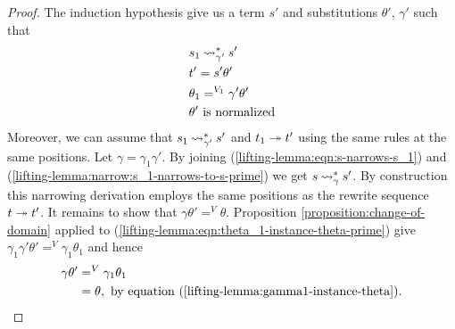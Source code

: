 \begin{lemma}
\begin{proof}
		The induction hypothesis give us a term $s'$ and substitutions $\theta'$, $\gamma'$ such that
		\begin{align}
			 & s_1 \mathbin{\rightsquigarrow}_{\gamma'}^{*} s' \label{lifting-lemma:narrow:s_1-narrows-to-s-prime}       \\
			 & t' = s'\theta'                                                                         \\
			 & \theta_1 =^{V_1} \gamma'\theta' \label{lifting-lemma:eqn:theta_1-instance-theta-prime} \\
			 & \theta' \text{ is normalized} \label{lifting-lemma:eqn:theta-prime-is-normalized}
		\end{align}
		Moreover, we can assume that $s_1 \mathbin{\rightsquigarrow}_{\gamma'}^{*} s'$ and $t_1 \twoheadrightarrow t'$ using the same rules at the same positions. Let $\gamma = \gamma_1 \gamma'$. By joining (\ref{lifting-lemma:eqn:s-narrows-s_1}) and (\ref{lifting-lemma:narrow:s_1-narrows-to-s-prime}) we get $s \mathbin{\rightsquigarrow}_{\gamma}^{*} s'$. By construction this narrowing derivation employs the same positions as the rewrite sequence $t \twoheadrightarrow t'$. It remains to show that $\gamma \theta' =^V \theta$. Proposition \ref{proposition:change-of-domain} applied to (\ref{lifting-lemma:eqn:theta_1-instance-theta-prime}) give $\gamma_1 \gamma'\theta' =^V \gamma_1\theta_1$ and hence
		\begin{align*}
			\gamma \theta' & =^V \gamma_1\theta_1                                                       \\
			               & = \theta, \text{ by equation (\ref{lifting-lemma:gamma1-instance-theta}).}
		\end{align*}
	\end{proof}
\end{lemma}

